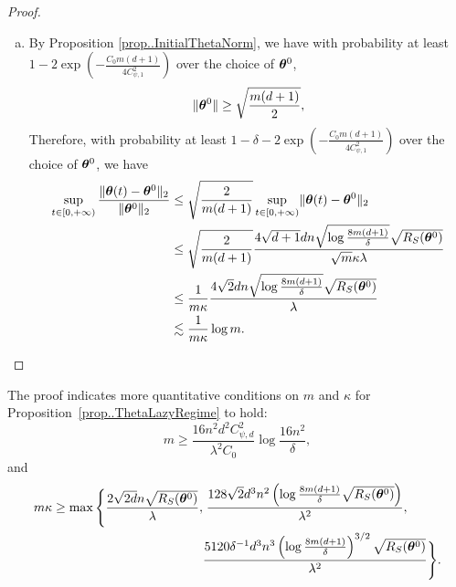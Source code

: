 \documentclass{article}
\begin{document}
\begin{proof}
\begin{enumerate}[(a)]
\begin{enumerate}[(i)]
\begin{equation*}
                        \end{equation*}
                        Suppose that $t^*<+\infty$ then one can take the limit $t\to t^*$ in~\eqref{thm-proof:step1} and~\eqref{thm-proof:step2}. This will lead to a contradiction with the definition of $t^*$. Therefore $t^*=+\infty$.
              \end{enumerate}
        \item By Proposition \ref{prop..InitialThetaNorm}, we have with probability at least $1-2\exp\left(-\frac{C_0m(d+1)}{4C^2_{\psi,1}}\right)$ over the choice of $\bm{\theta}^0$, 
        \begin{equation*}
            \lVert\bm{\theta}^0\rVert\geq \sqrt{\frac{m(d+1)}{2}},
        \end{equation*}
        Therefore, with probability at least $1-\delta-2\exp\left(-\frac{C_0m(d+1)}{4C^2_{\psi,1}}\right)$ over the choice of $\bm{\theta}^0$, we have
              \begin{equation*}
                  \begin{aligned}
                      \sup\limits_{t\in[0,+\infty)}\frac{\lVert\bm{\theta}(t)-\bm{\theta}^0\rVert_2}{\lVert\bm{\theta}^0\rVert_2}
                       & \leq \sqrt{\frac{2}{m(d+1)}}\sup\limits_{t\in[0,+\infty)}\lVert\bm{\theta}(t)-\bm{\theta}^0\rVert_2                                          \\
                       & \leq  \sqrt{\frac{2}{m(d+1)}} \frac{4\sqrt{d+1}dn\sqrt{\log\frac{8m(d+1)}{\delta}}\sqrt{R_S(\bm{\theta}^0)}}{\sqrt{m}\kappa\lambda} \\
                       & \leq \frac{1}{m\kappa}\frac{4\sqrt{2}dn\sqrt{\log\frac{8m(d+1)}{\delta}}\sqrt{R_S(\bm{\theta}^0)}}{\lambda}                         \\
                       & \lesssim \frac{1}{m\kappa}\log m.
                  \end{aligned}
              \end{equation*}
    \end{enumerate}
\end{proof}
\begin{rmk}
    The proof indicates more quantitative conditions on $m$ and $\kappa$ for Proposition~\ref{prop..ThetaLazyRegime} to hold:
    \begin{equation}
        m\geq \frac{16n^2d^2C_{\psi,d}^2}{\lambda^2C_0}\log\frac{16n^2}{\delta},
    \end{equation}
    and
    \begin{equation}
        \begin{aligned}
            m\kappa\geq\max\Bigg\{\frac{2\sqrt{2d}n\sqrt{R_S(\bm{\theta}^0)}}{\lambda}, & \;\frac{128\sqrt{2}d^3n^2\left(\log\frac{8m(d+1)}{\delta}\sqrt{R_S(\bm{\theta}^0)}\right)}{\lambda^2},                \\
                                                                                    & \frac{5120\delta^{-1}d^3n^3\left(\log\frac{8m(d+1)}{\delta}\right)^{3/2}\sqrt{R_S(\bm{\theta}^0)}}{\lambda^2}\Bigg\}.
        \end{aligned}
    \end{equation}
\end{rmk}
\end{document}
